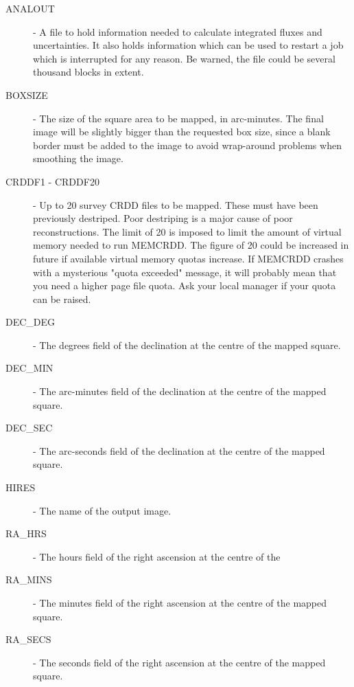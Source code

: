 \begin {description}

\item [ANALOUT] - A file to hold information needed to calculate integrated
fluxes  and uncertainties. It also holds information which can be used to
restart a job  which is interrupted for any reason. Be warned, the file could
be several  thousand blocks in extent.

\item [BOXSIZE] - The size of the square area to be mapped, in arc-minutes. The
final image will be slightly bigger than the requested box size, since a blank
border must be added to the image to avoid wrap-around problems when smoothing 
the image.

\item  [CRDDF1 - CRDDF20] - Up to 20 survey CRDD files to be mapped. These must 
have been previously destriped. Poor destriping is a major cause of poor 
reconstructions. The limit of 20 is imposed to limit the amount of virtual
memory needed to run MEMCRDD. The figure of 20 could be increased in future
if available virtual memory quotas increase. If MEMCRDD crashes with a 
mysterious "quota exceeded" message, it will probably mean that you need a
higher page file quota. Ask your local manager if your quota can be raised.

\item [DEC\_DEG] - The degrees field of the declination at the centre of the 
mapped square.

\item [DEC\_MIN] - The arc-minutes field of the declination at the centre of
the  mapped square.

\item [DEC\_SEC] - The arc-seconds field of the declination at the centre of
the  mapped square.

\item [HIRES] - The name of the output image.

\item [RA\_HRS] - The hours field of the right ascension at the centre of the 

\item [RA\_MINS] - The minutes field of the right ascension at the centre of the 
mapped square.

\item [RA\_SECS] - The seconds field of the right ascension at the centre of
the  mapped square.

\end {description}

